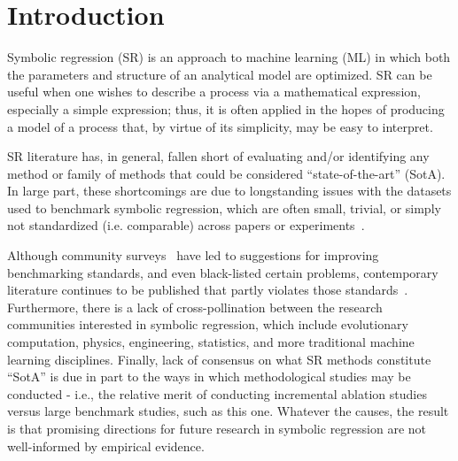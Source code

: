 \section{Introduction}


Symbolic regression (SR) is an approach to machine learning (ML) in which both the parameters and structure of an analytical model are optimized. 
SR can be useful when one wishes to describe a process via a mathematical expression, especially a simple expression; thus, it is often applied in the hopes of producing a model of a process that, by virtue of its simplicity, may be easy to interpret.

SR literature has, in general, fallen short of evaluating and/or identifying any method or family of methods that could be considered ``state-of-the-art'' (SotA).
In large part, these shortcomings are due to longstanding issues with the datasets used to benchmark symbolic regression, which are often small, trivial, or simply not standardized (i.e. comparable) across papers or experiments~\cite{mcdermottGeneticProgrammingNeeds2012b}.

Although community surveys~\cite{whiteBetterGPBenchmarks2012a,mcdermottGeneticProgrammingNeeds2012b} have led to suggestions for improving benchmarking standards, and even black-listed certain problems, contemporary literature continues to be published that partly violates those standards~\cite{petersenDeepSymbolicRegression2020}.
Furthermore, there is a lack of cross-pollination between the research communities interested in symbolic regression, which include evolutionary computation, physics, engineering, statistics, and more traditional machine learning disciplines. 
Finally, lack of consensus on what SR methods constitute ``SotA'' is due in part to the ways in which methodological studies may be conducted - i.e., the relative merit of conducting incremental ablation studies versus large benchmark studies, such as this one. 
Whatever the causes, the result is that promising directions for future research in symbolic regression are not well-informed by empirical evidence. 

